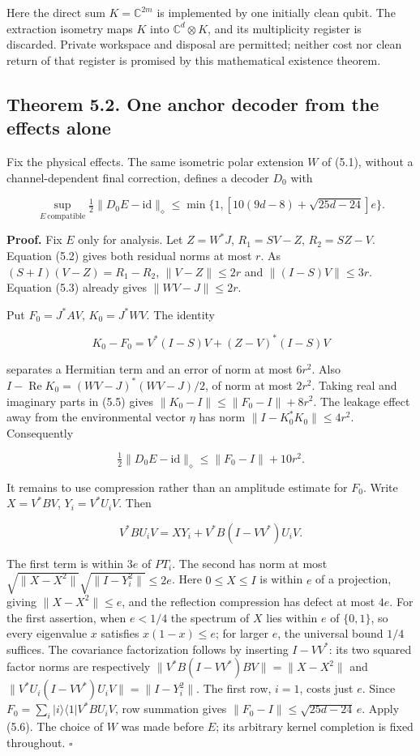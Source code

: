 \documentclass[11pt]{article}
\begin{document}
Here the direct sum \(K=\mathbb C^{2m}\) is implemented by one initially
clean qubit. The extraction isometry maps \(K\) into
\(\mathbb C^d\otimes K\), and its multiplicity register is discarded.
Private workspace and disposal are permitted; neither cost nor clean return
of that register is promised by this mathematical existence theorem.

\subsection*{Theorem 5.2. One anchor decoder from the effects alone}

Fix the physical effects. The same isometric polar extension \(W\) of (5.1),
without a channel-dependent final correction, defines a decoder \(D_0\) with

\[
\sup_{E\ \mathrm{compatible}}\tfrac12\|D_0E-\mathrm{id}\|_\diamond
\le\min\{1,[10(9d-8)+\sqrt{25d-24}]e\}.
\tag{5.4}
\]

\textbf{Proof.} Fix \(E\) only for analysis. Let \(Z=W^*J\),
\(R_1=SV-Z\), \(R_2=SZ-V\). Equation (5.2) gives both residual norms
at most \(r\). As \((S+I)(V-Z)=R_1-R_2\),
\(\|V-Z\|\le2r\) and \(\|(I-S)V\|\le3r\).
Equation (5.3) already gives \(\|WV-J\|\le2r\).

Put \(F_0=J^*AV\), \(K_0=J^*WV\). The identity

\[
K_0-F_0=V^*(I-S)V+(Z-V)^*(I-S)V
\tag{5.5}
\]

separates a Hermitian term and an error of norm at most \(6r^2\).
Also \(I-\operatorname{Re}K_0=(WV-J)^*(WV-J)/2\), of norm at most
\(2r^2\). Taking real and imaginary parts in (5.5) gives
\(\|K_0-I\|\le\|F_0-I\|+8r^2\).
The leakage effect away from the environmental vector \(\eta\) has norm
\(\|I-K_0^*K_0\|\le4r^2\). Consequently

\[
\tfrac12\|D_0E-\mathrm{id}\|_\diamond
\le\|F_0-I\|+10r^2.
\tag{5.6}
\]

It remains to use compression rather than an amplitude estimate for \(F_0\).
Write \(X=V^*BV\), \(Y_i=V^*U_iV\). Then

\[
V^*BU_iV=XY_i+V^*B(I-VV^*)U_iV.
\]

The first term is within \(3e\) of \(PT_i\). The second has norm at most
\(\sqrt{\|X-X^2\|}\sqrt{\|I-Y_i^2\|}\le2e\). Here \(0\le X\le I\)
is within \(e\) of a projection, giving \(\|X-X^2\|\le e\), and the
reflection compression has defect at most \(4e\). For the first assertion,
when \(e<1/4\) the spectrum of \(X\) lies within \(e\) of \(\{0,1\}\),
so every eigenvalue \(x\) satisfies \(x(1-x)\le e\); for larger \(e\),
the universal bound \(1/4\) suffices. The covariance factorization follows
by inserting \(I-VV^*\): its two squared factor norms are respectively
\(\|V^*B(I-VV^*)BV\|=\|X-X^2\|\) and
\(\|V^*U_i(I-VV^*)U_iV\|=\|I-Y_i^2\|\).
The first row, \(i=1\),
costs just \(e\). Since
\(F_0=\sum_i|i\rangle\langle1|V^*BU_iV\), row summation gives
\(\|F_0-I\|\le\sqrt{25d-24}\,e\). Apply (5.6).
The choice of \(W\) was made before \(E\); its arbitrary kernel completion
is fixed throughout. \hfill\(\square\)
\end{document}
